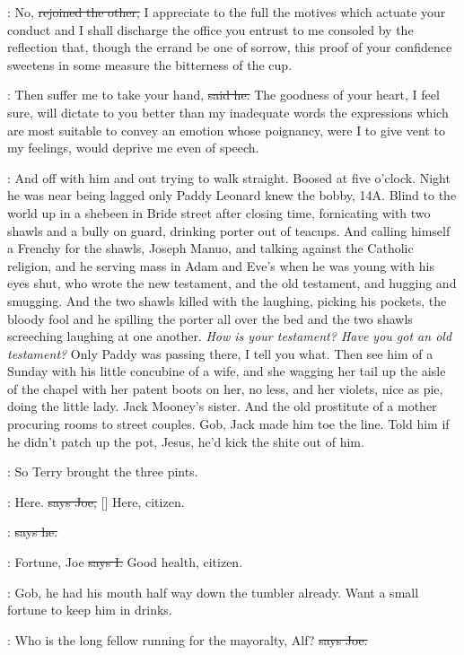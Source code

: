 \Bloom:
No,
\sout{rejoined the other,}
I appreciate to the full the motives which
actuate your conduct and I shall discharge the office you entrust
to me consoled by the reflection that,
though the errand be one of
sorrow,
this proof of your confidence sweetens in some measure the
bitterness of the cup.

\doran:
Then suffer me to take your hand,
\sout{said he.}
The goodness of your heart,
I
feel sure,
will dictate to you better than my inadequate words the
expressions which are most suitable to convey an emotion whose
poignancy,
were I to give vent to my feelings,
would deprive me even of
speech.

\Nq:
And off with him and out trying to walk straight.
Boosed at five
o'clock.
Night he was near being lagged only Paddy Leonard knew the bobby,
14A.
Blind to the world up in a shebeen in Bride street after closing
time,
fornicating with two shawls and a bully on guard,
drinking porter
out of teacups.
And calling himself a Frenchy for the shawls,
Joseph
Manuo,
and talking against the Catholic religion,
and he serving mass in
Adam and Eve's when he was young with his eyes shut,
who wrote the new
testament,
and the old testament,
and hugging and smugging.
And the two
shawls killed with the laughing,
picking his pockets,
the bloody
fool and he spilling the porter all over the bed and the two shawls
screeching laughing at one another.
\emph{How is your testament?
Have you
got an old testament?} Only Paddy was passing there,
I tell you what.
Then see him of a Sunday with his little concubine of a wife,
and
she wagging her tail up the aisle of the chapel with her patent boots
on her,
no less,
and her violets,
nice as pie,
doing the little lady.
Jack Mooney's sister.
And the old prostitute of a mother
procuring rooms to street couples.
Gob,
Jack made him toe the line.
Told
him if he didn't patch up the pot,
Jesus,
he'd kick the shite out of him.

\Nq:
So Terry brought the three pints.

\joe:
Here.
\sout{says Joe,}
[] Here,
citizen.

\citizen:
\sout{says he.}

:
Fortune,
Joe
\sout{says I.}
Good health,
citizen.

\Nq:
Gob,
he had his mouth half way down the tumbler already.
Want a
small fortune to keep him in drinks.

\joe:
Who is the long fellow running for the mayoralty,
Alf?
\sout{says Joe.}

